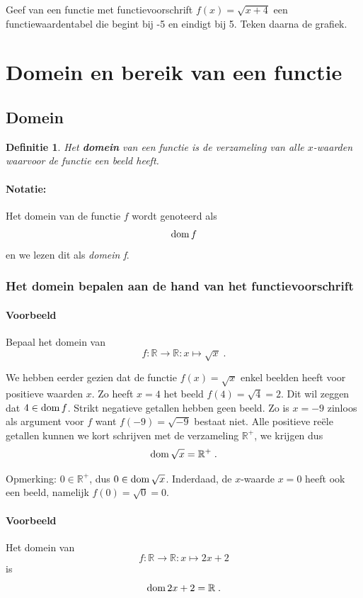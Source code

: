 \documentclass[12pt,twoside]{article}
\newtheorem{definition}{Definitie}
\begin{document}
\begin{oefening}
Geef van een functie met functievoorschrift $f(x)=\sqrt{x+4}$ een functiewaardentabel die begint bij -5 en eindigt bij 5. Teken daarna de grafiek.
\end{oefening}


\newpage
\section{Domein en bereik van een functie}

\subsection{Domein}

\begin{definition}
Het {\bf domein} van een functie is de verzameling van alle $x$-waarden waarvoor de functie een beeld heeft.
\end{definition}

\paragraph{Notatie:} Het domein van de functie $f$ wordt genoteerd als $$\dom f$$ en we lezen dit als {\em domein f}.

\subsubsection{Het domein bepalen aan de hand van het functievoorschrift}

\paragraph{Voorbeeld} Bepaal het domein van $$f:\mathbb{R}\to\mathbb{R}:x\mapsto \sqrt{x}\;.$$

We hebben eerder gezien dat de functie $f(x)=\sqrt{x}$ enkel beelden heeft voor positieve waarden $x$. Zo heeft $x=4$ het beeld $f(4)=\sqrt{4}=2$. Dit wil zeggen dat $4\in\dom f$. Strikt negatieve getallen hebben geen beeld. Zo is $x=-9$ zinloos als argument voor $f$ want $f(-9)=\sqrt{-9}$ bestaat niet. Alle positieve reële getallen kunnen we kort schrijven met de verzameling $\mathbb{R}^+$, we krijgen dus
$$\dom \sqrt{x}= \mathbb{R}^+\;.$$

Opmerking: $0\in\mathbb{R}^+$, dus $0\in\dom\sqrt{x}$. Inderdaad, de $x$-waarde $x=0$ heeft ook een beeld, namelijk $f(0)=\sqrt{0}=0$.

\paragraph{Voorbeeld}
Het domein van
$$f:\mathbb{R}\to\mathbb{R}:x\mapsto 2x+2$$
is
$$\dom 2x+2 = \mathbb{R}\;.$$
\end{document}
